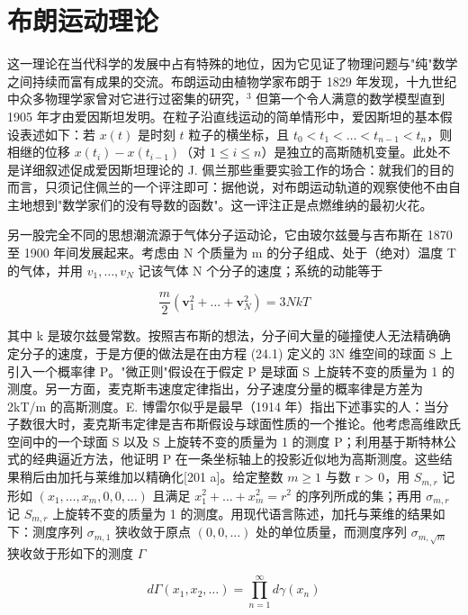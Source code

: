\section*{布朗运动理论}
{}

这一理论在当代科学的发展中占有特殊的地位，因为它见证了物理问题与"纯"数学之间持续而富有成果的交流。布朗运动由植物学家布朗于 1829 年发现，十九世纪中众多物理学家曾对它进行过密集的研究，\(^{3}\) 但第一个令人满意的数学模型直到 1905 年才由爱因斯坦发明。在粒子沿直线运动的简单情形中，爱因斯坦的基本假设表述如下：若 \(x(t)\) 是时刻 \(t\) 粒子的横坐标，且 \(t_0 < t_1 < \ldots < t_{n-1} < t_n\)，则相继的位移 \(x(t_i) - x(t_{i-1})\)（对 \(1 \leq i \leq n\)）是独立的高斯随机变量。此处不是详细叙述促成爱因斯坦理论的 J. 佩兰那些重要实验工作的场合：就我们的目的而言，只须记住佩兰的一个评注即可：据他说，对布朗运动轨道的观察使他不由自主地想到"数学家们的没有导数的函数"。这一评注正是点燃维纳的最初火花。

另一股完全不同的思想潮流源于气体分子运动论，它由玻尔兹曼与吉布斯在 1870 至 1900 年间发展起来。考虑由 N 个质量为 m 的分子组成、处于（绝对）温度 T 的气体，并用 \(v_{1}, \ldots, v_{N}\) 记该气体 N 个分子的速度；系统的动能等于

\[
\frac {m}{2} (\mathbf {v} _ {1} ^ {2} + \dots + \mathbf {v} _ {N} ^ {2}) = 3 N k T\tag{24.1}
\]

其中 k 是玻尔兹曼常数。按照吉布斯的想法，分子间大量的碰撞使人无法精确确定分子的速度，于是方便的做法是在由方程 (24.1) 定义的 3N 维空间的球面 S 上引入一个概率律 P。"微正则"假设在于假定 P 是球面 S 上旋转不变的质量为 1 的测度。另一方面，麦克斯韦速度定律指出，分子速度分量的概率律是方差为 2kT/m 的高斯测度。E. 博雷尔似乎是最早（1914 年）指出下述事实的人：当分子数很大时，麦克斯韦定律是吉布斯假设与球面性质的一个推论。他考虑高维欧氏空间中的一个球面 S 以及 S 上旋转不变的质量为 1 的测度 P；利用基于斯特林公式的经典逼近方法，他证明 P 在一条坐标轴上的投影近似地为高斯测度。这些结果稍后由加托与莱维加以精确化{[}201 a{]}。给定整数 \(m \geq 1\) 与数 r > 0，用 \(S_{m,r}\) 记形如 \((x_{1}, \ldots, x_{m}, 0, 0, \ldots)\) 且满足 \(x_{1}^{2} + \ldots + x_{m}^{2} = r^{2}\) 的序列所成的集；再用 \(\sigma_{m,r}\) 记 \(S_{m,r}\) 上旋转不变的质量为 1 的测度。用现代语言陈述，加托与莱维的结果如下：测度序列 \(\sigma_{m,1}\) 狭收敛于原点 \((0, 0, \ldots)\) 处的单位质量，而测度序列 \(\sigma_{m,\sqrt{m}}\) 狭收敛于形如下的测度 \(\Gamma\)

\[
d \Gamma (x _ {1}, x _ {2}, \dots) = \prod_ {n = 1} ^ {\infty} d \gamma (x _ {n})
\]

